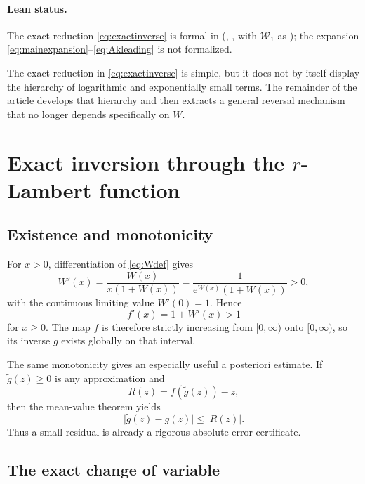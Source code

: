 \documentclass[11pt]{article}
\theoremstyle{clean}
\newcommand{\rLambert}{\mathcal W}
\newcommand{\e}{\mathrm e}
\begin{document}
\paragraph{Lean status.}
The exact reduction \eqref{eq:exactinverse} is formal in 
(, , with
\(\rLambert_1\) as ); the expansion
\eqref{eq:mainexpansion}--\eqref{eq:Akleading} is not formalized.

The exact reduction in \cref{eq:exactinverse} is simple, but it does not by
itself display the hierarchy of logarithmic and exponentially small terms.
The remainder of the article develops that hierarchy and then extracts a
general reversal mechanism that no longer depends specifically on \(W\).

\section{Exact inversion through the \texorpdfstring{\(r\)}{r}-Lambert function}

\subsection{Existence and monotonicity}

For \(x>0\), differentiation of \cref{eq:Wdef} gives
\begin{equation}\label{eq:Wprime}
  W'(x)=\frac{W(x)}{x(1+W(x))}
       =\frac{1}{\e^{W(x)}(1+W(x))}>0,
\end{equation}
with the continuous limiting value \(W'(0)=1\).  Hence
\[
  f'(x)=1+W'(x)>1
\]
for \(x\ge0\).  The map \(f\) is therefore strictly increasing from
\([0,\infty)\) onto \([0,\infty)\), so its inverse \(g\) exists globally on
that interval.

The same monotonicity gives an especially useful a posteriori estimate.  If
\(\widetilde g(z)\ge0\) is any approximation and
\begin{equation}\label{eq:residualdef}
  R(z)=f(\widetilde g(z))-z,
\end{equation}
then the mean-value theorem yields
\begin{equation}\label{eq:residualbound}
  \bigl|\widetilde g(z)-g(z)\bigr|\le |R(z)|.
\end{equation}
Thus a small residual is already a rigorous absolute-error certificate.

\subsection{The exact change of variable}
\end{document}
